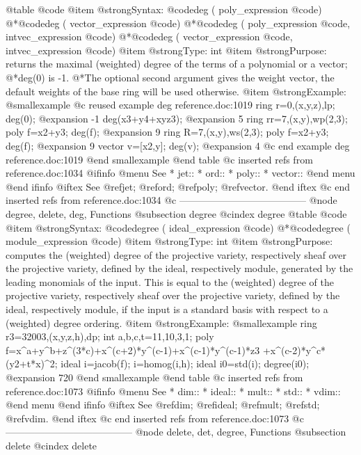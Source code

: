 @table @code
@item @strong{Syntax:}
@code{deg (} poly_expression @code{)}
@*@code{deg (} vector_expression @code{)}
@*@code{deg (} poly_expression @code{,} intvec_expression @code{)}
@*@code{deg (} vector_expression @code{,} intvec_expression @code{)}
@item @strong{Type:}
int
@item @strong{Purpose:}
returns the maximal (weighted) degree of
the terms of a polynomial or a vector;
@*deg(0) is -1.
@*The optional second argument gives the weight vector,
the default weights of the base ring will be used otherwise.
@item @strong{Example:}
@smallexample
@c reused example deg reference.doc:1019 
  ring r=0,(x,y,z),lp;
  deg(0);
@expansion{} -1
  deg(x3+y4+xyz3);
@expansion{} 5
  ring rr=7,(x,y),wp(2,3);
  poly f=x2+y3;
  deg(f);
@expansion{} 9
  ring R=7,(x,y),ws(2,3);
  poly f=x2+y3;
  deg(f);
@expansion{} 9
  vector v=[x2,y];
  deg(v);
@expansion{} 4
@c end example deg reference.doc:1019
@end smallexample
@end table
@c inserted refs from reference.doc:1034
@ifinfo
@menu
See
* jet::
* ord::
* poly::
* vector::
@end menu
@end ifinfo
@iftex
See
@ref{jet};
@ref{ord};
@ref{poly};
@ref{vector}.
@end iftex
@c end inserted refs from reference.doc:1034
@c ---------------------------------------
@node degree, delete, deg, Functions
@subsection degree
@cindex degree
@table @code
@item @strong{Syntax:}
@code{degree (} ideal_expression @code{)}
@*@code{degree (} module_expression @code{)}
@item @strong{Type:}
int
@item @strong{Purpose:}
computes the (weighted) degree of the projective
variety, respectively sheaf over the projective variety, defined by the ideal,
respectively module, generated by the leading monomials of the input.  
This is equal to the
(weighted) degree of the projective variety, respectively
sheaf over the projective variety, defined by the ideal,
respectively module, if the 
input is a standard basis with respect to a (weighted) degree ordering. 
@item @strong{Example:}
@smallexample
ring r3=32003,(x,y,z,h),dp;
int a,b,c,t=11,10,3,1;
poly f=x^a+y^b+z^(3*c)+x^(c+2)*y^(c-1)+x^(c-1)*y^(c-1)*z3
  +x^(c-2)*y^c*(y2+t*x)^2;
ideal i=jacob(f);
i=homog(i,h);
ideal i0=std(i);
degree(i0);
@expansion{} 720 
@end smallexample
@end table
@c inserted refs from reference.doc:1073
@ifinfo
@menu
See
* dim::
* ideal::
* mult::
* std::
* vdim::
@end menu
@end ifinfo
@iftex
See
@ref{dim};
@ref{ideal};
@ref{mult};
@ref{std};
@ref{vdim}.
@end iftex
@c end inserted refs from reference.doc:1073
@c ---------------------------------------
@node delete, det, degree, Functions
@subsection delete
@cindex delete

